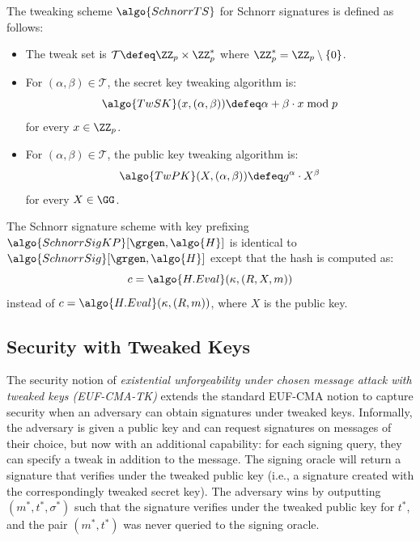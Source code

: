\begin{definition}[SchnorrTS]\label{def:schnorrts}
  The tweaking scheme $\algo{SchnorrTS}$ for Schnorr signatures is defined as follows:
  \begin{itemize}
    \item The tweak set is $\mathcal{T} \defeq \ZZ_p \times \ZZ_p^*$ where $\ZZ_p^* = \ZZ_p \setminus \{0\}$.
    \item For $(\alpha, \beta) \in \mathcal{T}$, the secret key tweaking algorithm is:
    \[
      \algo{TwSK}(x, (\alpha, \beta)) \defeq \alpha + \beta \cdot x \bmod p
    \]
    for every $x \in \ZZ_p$.
    \item For $(\alpha, \beta) \in \mathcal{T}$, the public key tweaking algorithm is:
    \[
      \algo{TwPK}(X, (\alpha, \beta)) \defeq g^\alpha \cdot X^\beta
    \]
    for every $X \in \GG$.
  \end{itemize}
\end{definition}

\begin{definition}\label{def:schnorr-kp}
  The Schnorr signature scheme with key prefixing $\algo{SchnorrSigKP}[\grgen, \algo{H}]$ is identical to $\algo{SchnorrSig}[\grgen, \algo{H}]$ except that the hash is computed as:
  \[
    c = \algo{H.Eval}(\kappa, (R, X, m))
  \]
  instead of $c = \algo{H.Eval}(\kappa, (R, m))$, where $X$ is the public key.
\end{definition}

\subsection{Security with Tweaked Keys}

The security notion of \emph{existential unforgeability under chosen message attack with tweaked keys (EUF-CMA-TK)}\label{def:euf-cma-tk-informal} extends the standard EUF-CMA notion to capture security when an adversary can obtain signatures under tweaked keys.
Informally, the adversary is given a public key and can request signatures on messages of their choice, but now with an additional capability: for each signing query, they can specify a tweak in addition to the message.
The signing oracle will return a signature that verifies under the tweaked public key (i.e., a signature created with the correspondingly tweaked secret key).
The adversary wins by outputting $(m^*, t^*, \sigma^*)$ such that the signature verifies under the tweaked public key for $t^*$, and the pair $(m^*, t^*)$ was never queried to the signing oracle.

